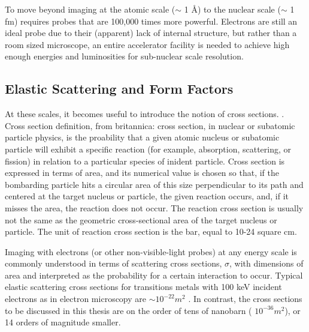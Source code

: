         To move beyond imaging at the atomic scale ($\sim$ 1 \AA) to the nuclear scale ($\sim$ 1 fm) requires probes that are 100,000 times more powerful. Electrons are still an ideal probe due to their (apparent) lack of internal structure, but rather than a room sized microscope, an entire accelerator facility is needed to achieve high enough energies and luminosities for sub-nuclear scale resolution. 
        


    \subsection{Elastic Scattering and Form Factors}


        At these scales, it becomes useful to introduce the notion of cross sections. 
        . Cross section definition, from britannica: cross section, in nuclear or subatomic particle physics, is the proability that a given atomic nucleus or subatomic particle will exhibit a specific reaction (for example, absorption, scattering, or fission) in relation to a particular species of inident particle. Cross section is expressed in terms of area, and its numerical value is chosen so that, if the bombarding particle hits a circular area of this size perpendicular to its path and centered at the target nucleus or particle, the given reaction occurs, and, if it misses the area, the reaction does not occur. The reaction cross section is usually not the same as the geometric cross-sectional area of the target nucleus or particle. The unit of reaction cross section is the bar, equal to 10-24 square cm. 

        Imaging with electrons (or other non-visible-light probes) at any energy scale is commonly understood in terms of scattering cross sections, $\sigma$, with dimensions of area and interpreted as the probability for a certain interaction to occur. Typical elastic scattering cross sections for transitions metals with 100 keV incident electrons as in electron microscopy are $\sim 10^{-22} m^2$ \parencite{Williams2009TransmissionMicroscopy}. In contrast, the cross sections to be discussed in this thesis are on the order of tens of nanobarn ( $10^{-36} m^2$), or 14 orders of magnitude smaller. 
        

